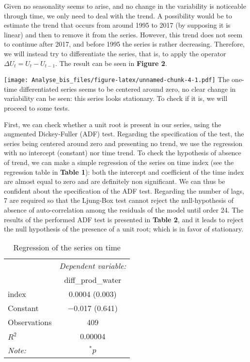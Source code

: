 \documentclass[
]{article}
\begin{document}
Given no seasonality seems to arise, and no change in the variability is
noticeable through time, we only need to deal with the trend. A
possibility would be to estimate the trend that occurs from around 1995
to 2017 (by supposing it is linear) and then to remove it from the
series. However, this trend does not seem to continue after 2017, and
before 1995 the series is rather decreasing. Therefore, we will instead
try to differentiate the series, that is, to apply the operator
\(\Delta U_t = U_t - U_{t-1}\). The result can be seen in \textbf{Figure
2}.

\texttt{[image: Analyse\_bis\_files/figure-latex/unnamed-chunk-4-1.pdf]}
The one-time differentiated series seems to be centered around zero, no
clear change in variability can be seen: this series looks stationary.
To check if it is, we will proceed to some tests.

First, we can check whether a unit root is present in our series, using
the augmented Dickey-Fuller (ADF) test. Regarding the specification of
the test, the series being centered around zero and presenting no trend,
we use the regression with no intercept (constant) nor time trend. To
check the hypothesis of absence of trend, we can make a simple
regression of the series on time index (see the regression table in
\textbf{Table 1}): both the intercept and coefficient of the time index
are almost equal to zero and are definitely non significant. We can thus
be confident about the specification of the ADF test. Regarding the
number of lags, 7 are required so that the Ljung-Box test cannot reject
the null-hypothesis of absence of auto-correlation among the residuals
of the model until order 24. The results of the performed ADF test is
presented in \textbf{Table 2}, and it leads to reject the null
hypothesis of the presence of a unit root; which is in favor of
stationary.

\begin{table}
  \centering
  \caption{Regression of the series on time}
  \label{}
  \begin{tabular}{lc}
    \hline
    \hline
    & \textit{Dependent variable:} \\
    \cline{2-2}
    & diff_prod_water \\
    \hline
    index & 0.0004 (0.003) \\
    Constant & $-$0.017 (0.641) \\
    \hline
    Observations & 409 \\
    $R^{2}$ & 0.00004 \\
    \hline
    \hline
    \textit{Note:} & $^{*}p$
  \end{tabular}
\end{table}
\end{document}
